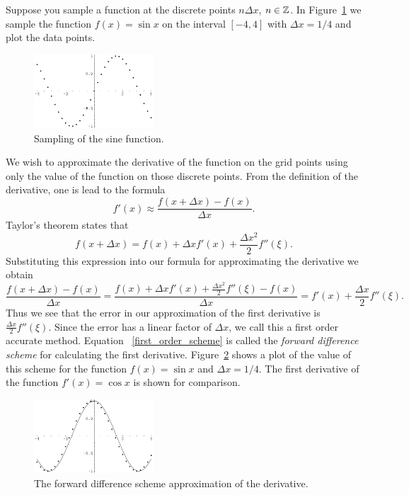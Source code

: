 \begin{Example}
  Suppose you sample a function at the discrete points $n \Delta x$, 
  $n \in \mathbb{Z}$.  In Figure~\ref{sindata} we sample the function 
  $f(x) = \sin x$ on the interval $[-4,4]$ with $\Delta x = 1/4$ and 
  plot the data points.  

  \begin{figure}[h!]
    \begin{center}
      \includegraphics[width=0.4\textwidth]{calculus/differential/sindata}
    \end{center}
    \caption{Sampling of the sine function.}
    \label{sindata}
  \end{figure}

  We wish to approximate the derivative of the function on the grid points
  using only the value of the function on those discrete points.  From
  the definition of the derivative, one is lead to the formula
  \begin{equation}
    \label{first_order_scheme}
    f'(x) \approx \frac{f(x+\Delta x) - f(x)}{\Delta x}.
  \end{equation}
  Taylor's theorem states that
  \[
  f(x + \Delta x) = f(x) + \Delta x f'(x) + \frac{\Delta x^2}{2} f''(\xi).
  \]
  Substituting this expression into our formula for approximating the derivative
  we obtain
  \[
  \frac{f(x+\Delta x) - f(x)}{\Delta x} = \frac{f(x) + \Delta x f'(x)
    + \frac{\Delta x^2}{2} f''(\xi) - f(x) }{\Delta x}
  = f'(x) + \frac{\Delta x}{2} f''(\xi).
  \]
  Thus we see that the error in our approximation of the first derivative is
  $\frac{\Delta x}{2} f''(\xi)$.  Since the error has a linear factor of 
  $\Delta x$, we call this a first order accurate method.  Equation
  ~\ref{first_order_scheme} is called the \textit{forward difference 
    scheme} for calculating the first derivative.  Figure~\ref{fwdsin} shows 
  a plot of the value of this scheme for the function $f(x) = \sin x$ and 
  $\Delta x = 1/4$.  The first derivative of the function $f'(x) = \cos x$ 
  is shown for comparison.

  \begin{figure}[h!]
    \begin{center}
      \includegraphics[width=0.4\textwidth]{calculus/differential/fwdsin}
    \end{center}
    \caption{The forward difference scheme approximation of the derivative.}
    \label{fwdsin}
  \end{figure}


\end{Example}
